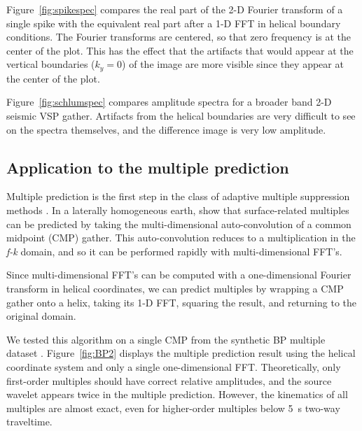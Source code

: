 Figure~\ref{fig:spikespec} compares the real part of the 2-D  Fourier
transform of a single spike with the equivalent real part after a 1-D
FFT in helical boundary conditions.  The Fourier transforms are
centered, so that zero frequency is at the center of the plot.  This
has the effect that the artifacts that would appear at the vertical
boundaries ($k_y=0$) of the image are more visible since they appear
at the center of the plot.

\par
Figure~\ref{fig:schlumspec} compares amplitude spectra for a broader 
band 2-D seismic VSP gather.  Artifacts from the helical boundaries
are very difficult to see on the spectra themselves, and the
difference image is very low amplitude.

\subsection{Application to the multiple prediction}
Multiple prediction is the first step in the class of adaptive
multiple suppression methods \cite{GEO.57.9.11661177}.  
In a laterally homogeneous earth,  show that 
surface-related multiples can be predicted by taking the
multi-dimensional auto-convolution of a common midpoint (CMP) gather.
This auto-convolution reduces to a multiplication in the {\em f-k}
domain, and so it can be performed rapidly with multi-dimensional
FFT's. 

\par
Since multi-dimensional FFT's can be computed with a one-dimensional
Fourier transform in helical coordinates, we can predict multiples by 
wrapping a CMP gather onto a helix, taking its 1-D FFT, squaring the 
result, and returning to the original domain.

\par
We tested this algorithm on a single CMP from the synthetic BP
multiple dataset \cite{BPmultiples}.
Figure~\ref{fig:BP2} displays the multiple prediction result using the
helical coordinate system and only a single one-dimensional FFT. 
Theoretically, only first-order multiples should have correct
relative amplitudes, and the source wavelet appears twice in the
multiple prediction.  However, the kinematics of all 
multiples are almost exact, even for higher-order multiples below 5~s 
two-way traveltime.


